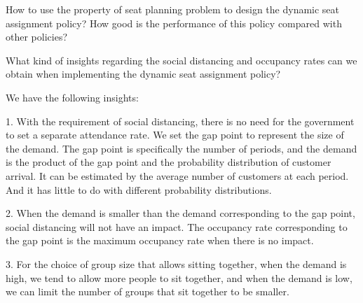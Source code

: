 How to use the property of seat planning problem to design the dynamic seat assignment policy? How good is the performance of this policy compared with other policies?

What kind of insights regarding the social distancing and occupancy rates can we obtain when implementing the dynamic seat assignment policy?





We have the following insights:

1.  With the requirement of social distancing, there is no need for the government to set a separate attendance rate. We set the gap point to represent the size of the demand. The gap point is specifically the number of periods, and the demand is the product of the gap point and the probability distribution of customer arrival. It can be estimated by the average number of customers at each period. And it has little to do with different probability distributions.

2. When the demand is smaller than the demand corresponding to the gap point, social distancing will not have an impact. The occupancy rate corresponding to the gap point is the maximum occupancy rate when there is no impact.

3.  For the choice of group size that allows sitting together, when the demand is high, we tend to allow more people to sit together, and when the demand is low, we can limit the number of groups that sit together to be smaller.


